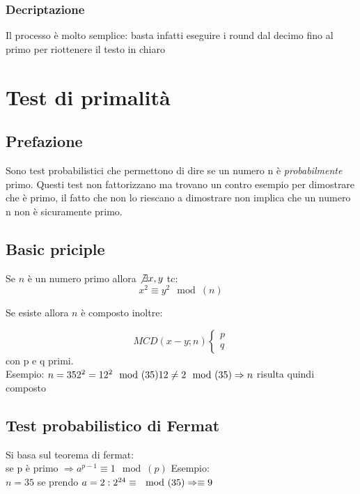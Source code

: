 \documentclass[10pt,a4paper]{article}
\begin{document}
\subsubsection{Decriptazione}
Il processo è molto semplice: basta infatti eseguire i round dal decimo fino al primo per riottenere il testo in chiaro

\section{Test di primalità}
\subsection{Prefazione}
Sono test probabilistici che permettono di dire se un numero n è \textit{probabilmente} primo. Questi test non fattorizzano ma trovano un contro esempio per dimostrare che è primo, il fatto che non lo riescano a dimostrare non implica che un numero n non è sicuramente primo.

\subsection{Basic priciple}
Se $n$ è un numero primo allora $\not \exists x,y$ tc:
$$x^2\equiv y^2 \mod(n)$$

Se esiste allora $n$ è composto inoltre:

$$MCD(x-y;n)
\begin{cases}
p\\q
\end{cases}
$$
con p e q primi.\\
Esempio:
$n=35\\
2^2=12^2 \mod(35)\\
12 \not = 2 \mod(35) \Rightarrow n$ risulta quindi composto\\

\subsection{Test probabilistico di Fermat}
Si basa sul teorema di fermat:\\
se p è primo $\Rightarrow a^{p-1}\equiv 1 \mod(p)$
Esempio:\\
$n=35$ se prendo $a=2:\\
2^{24}\equiv \mod(35) \Rightarrow \equiv 9
$
\end{document}
